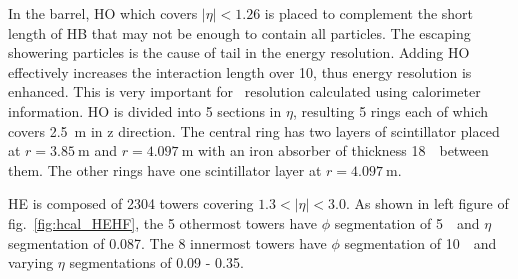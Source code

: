 In the barrel, HO which covers $|\eta|<1.26$ is placed to complement 
the short length of HB that may not be enough 
to contain all particles. The escaping showering particles 
is the cause of tail in the energy resolution. Adding HO effectively increases 
the interaction length over 10, thus energy resolution is enhanced.
This is very important for \met\ resolution calculated using calorimeter information. 
HO is divided into 5 sections in $\eta$, resulting 5 rings 
each of which covers 2.5~m in z direction. 
The central ring has two layers of scintillator placed at $r=3.85~\textrm{m}$ and 
$r=4.097~\textrm{m}$ with an iron absorber of thickness 18~\cm\ between them. 
The other rings have one scintillator layer at $r=4.097~\textrm{m}$.

HE is composed of 2304 towers covering $1.3 < |\eta| < 3.0$. 
As shown in left figure of fig.~\ref{fig:hcal_HEHF}, the 5 othermost towers have 
$\phi$ segmentation of 5~\dg\ and $\eta$ segmentation of 0.087. 
The 8 innermost towers have 
$\phi$ segmentation of 10~\dg\ and varying $\eta$ segmentations of 0.09 - 0.35. 

